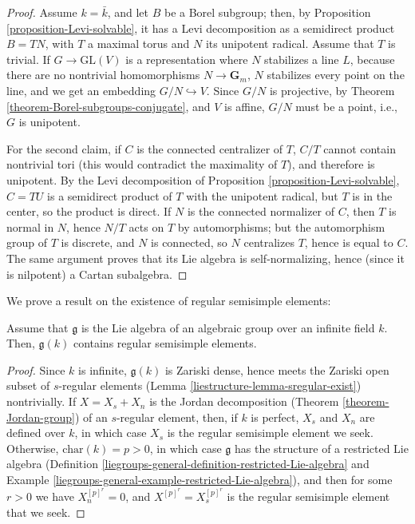 \begin{proof}
 Assume $k=\bar k$, and let $B$ be a Borel subgroup; then, by Proposition \ref{proposition-Levi-solvable}, it has a Levi decomposition as a semidirect product  $B=T N$, with $T$ a maximal torus and $N$ its unipotent radical. Assume that $T$ is trivial. If $G\to \text{GL}(V)$ is a representation where $N$ stabilizes a line $L$, because there are no nontrivial homomorphisms $N\to\mathbf{G}_m$, $N$ stabilizes every point on the line, and we get an embedding $G/N\hookrightarrow V$. Since $G/N$ is projective, by Theorem \ref{theorem-Borel-subgroups-conjugate}, and $V$ is affine, $G/N$ must be a point, i.e., $G$ is unipotent.
 
 For the second claim, if $C$ is the connected centralizer of $T$, $C/T$ cannot contain nontrivial tori (this would contradict the maximality of $T$), and therefore is unipotent. By the Levi decomposition of Proposition \ref{proposition-Levi-solvable}, $C=TU$ is a semidirect product of $T$ with the unipotent radical, but $T$ is in the center, so the product is direct. If $N$ is the connected normalizer of $C$, then $T$ is normal in $N$, hence $N/T$ acts on $T$ by automorphisms; but the automorphism group of $T$ is discrete, and $N$ is connected, so $N$ centralizes $T$, hence is equal to $C$. The same argument proves that its Lie algebra is self-normalizing, hence (since it is nilpotent) a Cartan subalgebra.
\end{proof}



We prove a result on the existence of regular semisimple elements:

\begin{lemma}
 \label{lemma-regular-semisimple-exist}
Assume that $\mathfrak g$ is the Lie algebra of an algebraic group over an infinite field $k$. Then, $\mathfrak g(k)$ contains regular semisimple elements. 
\end{lemma}

\begin{proof}
 Since $k$ is infinite, $\mathfrak g(k)$ is Zariski dense, hence meets the Zariski open subset of $s$-regular elements (Lemma \ref{liestructure-lemma-sregular-exist}) nontrivially. If $X=X_s+X_n$ is the Jordan decomposition (Theorem \ref{theorem-Jordan-group}) of an $s$-regular element, then, if $k$ is perfect, $X_s$ and $X_n$ are defined over $k$, in which case $X_s$ is the regular semisimple element we seek. Otherwise, $\text{char}(k)=p>0$, in which case $\mathfrak g$ has the structure of a restricted Lie algebra (Definition \ref{liegroups-general-definition-restricted-Lie-algebra} and Example \ref{liegroups-general-example-restricted-Lie-algebra}), and then for some $r>0$ we have $X_n^{[p]^r}=0$, and $X^{[p]^r}=X_s^{[p]^r}$ is the regular semisimple element that we seek.
\end{proof}


